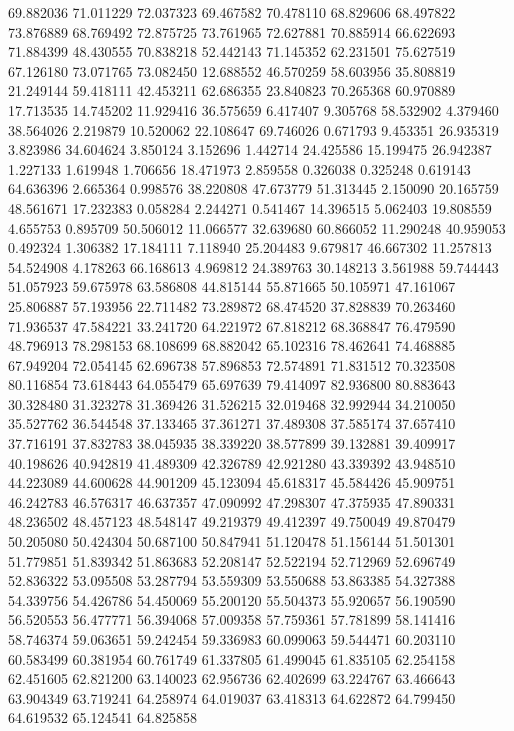 69.882036
71.011229
72.037323
69.467582
70.478110
68.829606
68.497822
73.876889
68.769492
72.875725
73.761965
72.627881
70.885914
66.622693
71.884399
48.430555
70.838218
52.442143
71.145352
62.231501
75.627519
67.126180
73.071765
73.082450
12.688552
46.570259
58.603956
35.808819
21.249144
59.418111
42.453211
62.686355
23.840823
70.265368
60.970889
17.713535
14.745202
11.929416
36.575659
6.417407
9.305768
58.532902
4.379460
38.564026
2.219879
10.520062
22.108647
69.746026
0.671793
9.453351
26.935319
3.823986
34.604624
3.850124
3.152696
1.442714
24.425586
15.199475
26.942387
1.227133
1.619948
1.706656
18.471973
2.859558
0.326038
0.325248
0.619143
64.636396
2.665364
0.998576
38.220808
47.673779
51.313445
2.150090
20.165759
48.561671
17.232383
0.058284
2.244271
0.541467
14.396515
5.062403
19.808559
4.655753
0.895709
50.506012
11.066577
32.639680
60.866052
11.290248
40.959053
0.492324
1.306382
17.184111
7.118940
25.204483
9.679817
46.667302
11.257813
54.524908
4.178263
66.168613
4.969812
24.389763
30.148213
3.561988
59.744443
51.057923
59.675978
63.586808
44.815144
55.871665
50.105971
47.161067
25.806887
57.193956
22.711482
73.289872
68.474520
37.828839
70.263460
71.936537
47.584221
33.241720
64.221972
67.818212
68.368847
76.479590
48.796913
78.298153
68.108699
68.882042
65.102316
78.462641
74.468885
67.949204
72.054145
62.696738
57.896853
72.574891
71.831512
70.323508
80.116854
73.618443
64.055479
65.697639
79.414097
82.936800
80.883643
30.328480
31.323278
31.369426
31.526215
32.019468
32.992944
34.210050
35.527762
36.544548
37.133465
37.361271
37.489308
37.585174
37.657410
37.716191
37.832783
38.045935
38.339220
38.577899
39.132881
39.409917
40.198626
40.942819
41.489309
42.326789
42.921280
43.339392
43.948510
44.223089
44.600628
44.901209
45.123094
45.618317
45.584426
45.909751
46.242783
46.576317
46.637357
47.090992
47.298307
47.375935
47.890331
48.236502
48.457123
48.548147
49.219379
49.412397
49.750049
49.870479
50.205080
50.424304
50.687100
50.847941
51.120478
51.156144
51.501301
51.779851
51.839342
51.863683
52.208147
52.522194
52.712969
52.696749
52.836322
53.095508
53.287794
53.559309
53.550688
53.863385
54.327388
54.339756
54.426786
54.450069
55.200120
55.504373
55.920657
56.190590
56.520553
56.477771
56.394068
57.009358
57.759361
57.781899
58.141416
58.746374
59.063651
59.242454
59.336983
60.099063
59.544471
60.203110
60.583499
60.381954
60.761749
61.337805
61.499045
61.835105
62.254158
62.451605
62.821200
63.140023
62.956736
62.402699
63.224767
63.466643
63.904349
63.719241
64.258974
64.019037
63.418313
64.622872
64.799450
64.619532
65.124541
64.825858
